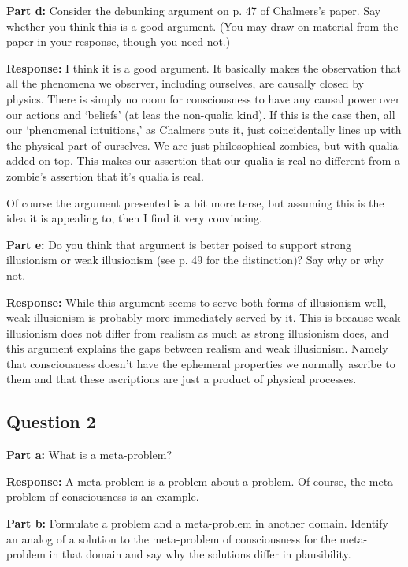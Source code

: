 \documentclass{article}
\begin{document}
\noindent\textbf{Part d:} Consider the debunking argument on p. 47 of Chalmers's paper. Say whether you think this is a good argument. (You may draw on material from the paper in your response, though you need not.)
\bigskip

\noindent\textbf{Response:} I think it is a good argument. It basically makes the observation that all the phenomena we observer, including ourselves, are causally closed by physics. There is simply no room for consciousness to have any causal power over our actions and `beliefs' (at leas the non-qualia kind). If this is the case then, all our `phenomenal intuitions,' as Chalmers puts it, just coincidentally lines up with the physical part of ourselves. We are just philosophical zombies, but with qualia added on top. This makes our assertion that our qualia is real no different from a zombie's assertion that it's qualia is real.

Of course the argument presented is a bit more terse, but assuming this is the idea it is appealing to, then I find it very convincing.
\bigskip

\noindent\textbf{Part e:} Do you think that argument is better poised to support strong illusionism or weak illusionism (see p. 49 for the distinction)? Say why or why not.
\bigskip

\noindent\textbf{Response:} While this argument seems to serve both forms of illusionism well, weak illusionism is probably more immediately served by it. This is because weak illusionism does not differ from realism as much as strong illusionism does, and this argument explains the gaps between realism and weak illusionism. Namely that consciousness doesn't have the ephemeral properties we normally ascribe to them and that these ascriptions are just a product of physical processes.
\bigskip

\subsection*{Question 2}
\noindent\textbf{Part a:} What is a meta-problem?
\bigskip

\noindent\textbf{Response:} A meta-problem is a problem about a problem. Of course, the meta-problem of consciousness is an example.
\bigskip

\noindent\textbf{Part b:} Formulate a problem and a meta-problem in another domain. Identify an analog of a solution to the meta-problem of consciousness for the meta-problem in that domain and say why the solutions differ in plausibility.
\bigskip
\end{document}
